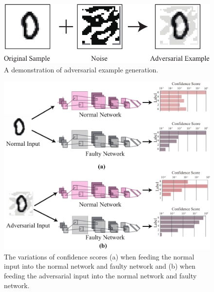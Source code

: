 \begin{figure}
    \centering
    \includegraphics[width=0.7\linewidth]{images/OL-fig5}
    \caption{A demonstration of adversarial example generation.}
    \label{fig:advexample} 
    \vspace {-15pt}
\end{figure}

\begin{figure}[b] 
    \centering
    \includegraphics[width=0.8\linewidth]{images/OL-fig6}
    \caption{ The variations of confidence scores (a) when feeding the normal input into the normal network and faulty network and (b) when feeding the adversarial input into the normal network and faulty network.}
    \label{fig:detection-mnist}
\end{figure}
                                                                                                                                                                                                                                                                        
